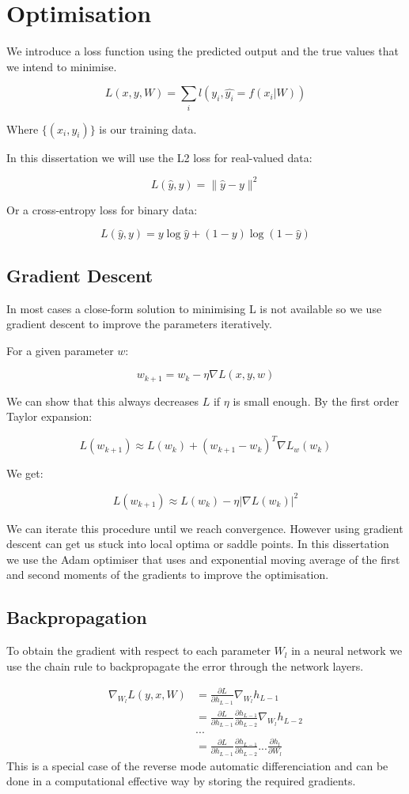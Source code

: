 \documentclass[11pt,oneside,openright]{report}
\begin{document}
\section{Optimisation}
We introduce a loss function using the predicted output and the true values that we intend to minimise.

$$L(x, y, W) = \sum_i l(y_i, \hat{y_i} = f(x_i|W))$$

Where $\{(x_i, y_i)\}$ is our training data. 

In this dissertation we will use the L2 loss for real-valued data:

$$ L(\hat{y}, y) = \lVert \hat{y} - y \rVert^2 $$

Or a cross-entropy loss for binary data:

$$ L(\hat{y}, y) = y \log \hat{y} + (1-y) \log(1 - \hat{y}) $$

\subsection{Gradient Descent}
In most cases a close-form solution to minimising L is not available so we use gradient descent to improve the parameters iteratively.

For a given parameter $w$:

$$ w_{k+1} = w_{k} - \eta \nabla L(x, y, w)$$

We can show that this always decreases $L$ if $\eta$ is small enough. By the first order Taylor expansion:

$$L(w_{k+1}) \approx L(w_{k}) + (w_{k+1} - w_{k})^T  \nabla L_{w}(w_{k}) $$

We get:

$$L(w_{k+1}) \approx L(w_{k}) - \eta | \nabla L(w_{k})|^2 $$

We can iterate this procedure until we reach convergence. However using gradient descent can get us stuck into local optima or saddle points. In this dissertation we use the Adam optimiser \cite{adam} that uses and exponential moving average of the first and second moments of the gradients to improve the optimisation.

 \subsection{Backpropagation}
To obtain the gradient with respect to each parameter $W_l$ in a neural network we use the chain rule to backpropagate the error through the network layers.
 
 \begin{align}
   \nabla_{W_l} L(y, x, W) &= \frac{\partial L}{\partial h_{L-1}} \nabla_{W_l} h_{L-1}\\
   &= \frac{\partial L}{\partial h_{L-1}} \frac{\partial h_{L-1}}{\partial h_{L-2}} \nabla_{W_l} h_{L-2}\\
   &...\\
   &= \frac{\partial L}{\partial h_{L-1}} \frac{\partial h_{L-1}}{\partial h_{L-2}} ... \frac{\partial h_l}{\partial W_l}
 \end{align}
 This is a special case of the reverse mode automatic differenciation and can be done in a computational effective way by storing the required gradients.
\end{document}
